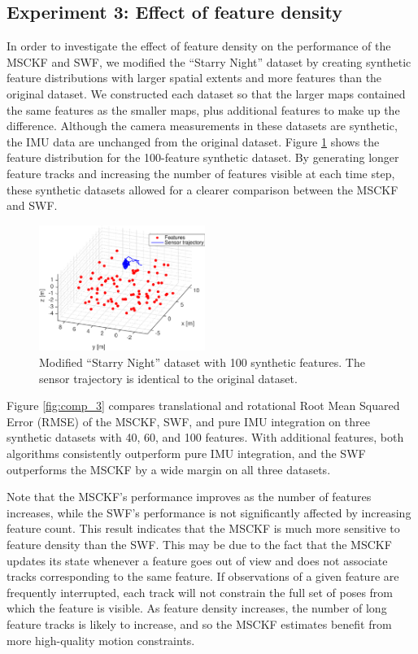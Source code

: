 \documentclass[letterpaper, 10 pt, conference]{ieeeconf}  %
\begin{document}
\subsection{Experiment 3: Effect of feature density}
In order to investigate the effect of feature density on the performance of the MSCKF and SWF, we modified the ``Starry Night'' dataset by creating synthetic feature distributions with larger spatial extents and more features than the original dataset.
We constructed each dataset so that the larger maps contained the same features as the smaller maps, plus additional features to make up the difference.
Although the camera measurements in these datasets are synthetic, the IMU data are unchanged from the original dataset.
Figure \ref{fig:trajectory_groundtruth_100lessnoisy} shows the feature distribution for the 100-feature synthetic dataset.
By generating longer feature tracks and increasing the number of features visible at each time step, these synthetic datasets allowed for a clearer comparison between the MSCKF and SWF.

\begin{figure}
    \centering
    \includegraphics[width=0.48\textwidth]{figs/trajectory_groundtruth_100lessnoisy}
    \caption{Modified ``Starry Night'' dataset with 100 synthetic features. The sensor trajectory is identical to the original dataset.}
    \label{fig:trajectory_groundtruth_100lessnoisy}
\end{figure}

Figure \ref{fig:comp_3} compares translational and rotational Root Mean Squared Error (RMSE) of the MSCKF, SWF, and pure IMU integration on three synthetic datasets with 40, 60, and 100 features.
With additional features, both algorithms consistently outperform pure IMU integration, and the SWF outperforms the MSCKF by a wide margin on all three datasets.

Note that the MSCKF's performance improves as the number of features increases, while the SWF's performance is not significantly affected by increasing feature count.
This result indicates that the MSCKF is much more sensitive to feature density than the SWF.
This may be due to the fact that the MSCKF updates its state whenever a feature goes out of view and does not associate tracks corresponding to the same feature.
If observations of a given feature are frequently interrupted, each track will not constrain the full set of poses from which the feature is visible.
As feature density increases, the number of long feature tracks is likely to increase, and so the MSCKF estimates benefit from more high-quality motion constraints.
\end{document}
